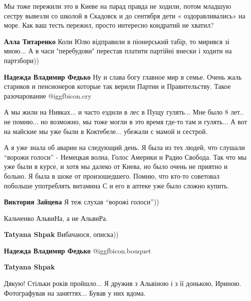\begin{itemize}
\begin{itemize}
\end{itemize} %


Мы тоже пережили это в Киеве на парад правда не ходили, потом младшую сестру
вывезли со школой в Скадовск и до сентября дети « оздоравливались» на море. Как
ваш тесть пережил, просто интересно кондратий не хватил?

\begin{itemize} %
\textbf{Алла Титаренко} Коли Юлю відправили в піонерський табір, то мирився зі мною... А в часи "перебудови" перестав платити партійні внески і ходити на партзбори))

\textbf{Надежда Владимир Федько} Ну и слава богу главное мир в семье. Очень жаль стариков и пенсионеров которые так верили Партии и Правительству. Такое разочарование  @igg{fbicon.cry} 
\end{itemize} %


А мы жили на Нивках... и часто ездили в лес в Пущу гулять... Мне было 8 лет.. не
помню... но возможно, мы тоже могли в это время где-то там и гулять... А вот на
майские мы уже были в Коктебеле... убежали с мамой и сестрой.



А я уже знала об аварии на следующий день. Я была из тех людей, что слушали
\enquote{ворожи голоси} - Немецкая волна, Голос Америки и Радио Свобода. Так что мы уже
были в курсе, и хотя мы далеко от Киева, но было очень не приятно и больно. Я
была в шоке от произошедшего. Помню, что кто-то советовал побольше употреблять
витамина С и его в аптеке уже было сложно купить.

\textbf{Виктория Зайцева} Я теж слухав \enquote{ворожі голоси}))

Кальченко АльвиНа, а не АльвиРа.

\begin{itemize} %
\textbf{Tatyana Shpak} Вибачаюся, описка))

\textbf{Надежда Владимир Федько}  @igg{fbicon.bouquet} 

\textbf{Tatyana Shpak} 

Дякую! Стільки років пройшло... Я дружив з Альвіною і з її донькою, Ириною.
Фотографував на заняттях... Бував у них вдома.


\end{itemize}
\end{itemize}
